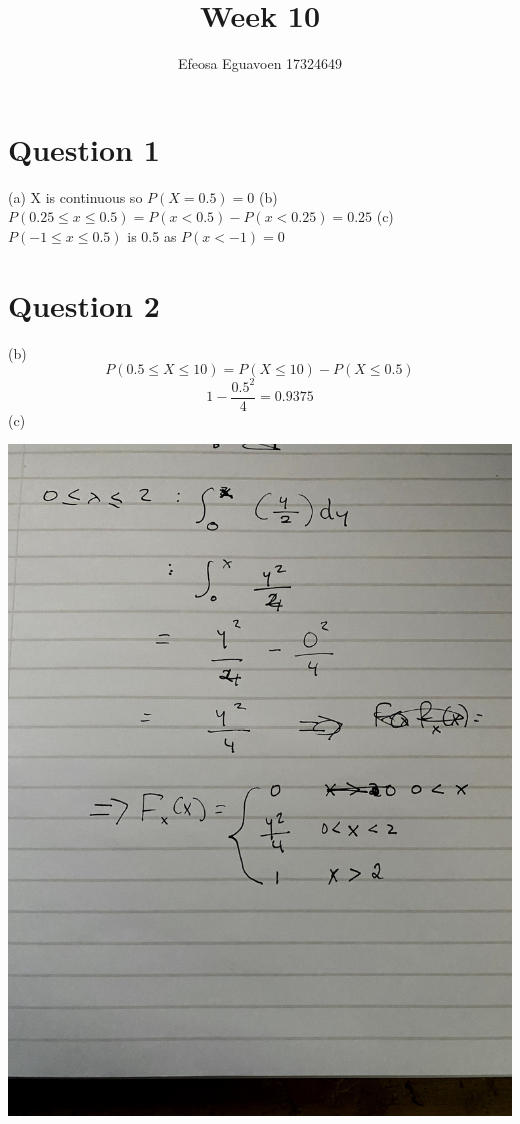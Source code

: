 \documentclass[11pt]{article} %
\title{Week 10}
\author{Efeosa Eguavoen 17324649}
\begin{document}
\maketitle

\section{Question 1}
(a)
X is continuous so \( P(X = 0.5) = 0 \)
\newline
\newline
(b)
\(P(0.25 \leq x \leq 0.5) = P(x < 0.5) - P(x < 0.25) = 0.25 \)
\newline
\newline
(c)
\(P(-1 \leq x \leq 0.5) \) is 0.5 as \(P(x< -1)  = 0\)

\section{Question 2}

(b) \[P(0.5 \leq X \leq 10) = P(X\leq10) - P(X\leq 0.5) \]
\[1 - \frac{0.5^2}{4} = 0.9375\]
(c)
\begin{center}
\includegraphics[scale = 0.15]{IMG_1689.jpg}
\end{center}
\end{document}
